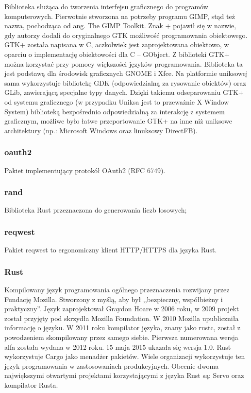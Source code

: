 \documentclass[12pt,a4paper]{article}
\begin{document}
					\indent  Biblioteka służąca do tworzenia interfejsu graficznego do programów komputerowych. Pierwotnie stworzona na potrzeby programu GIMP,
					stąd też nazwa, pochodząca od ang. The GIMP Toolkit. Znak + pojawił się w nazwie, gdy autorzy dodali do oryginalnego GTK możliwość programowania obiektowego.
					GTK+ została napisana w C, aczkolwiek jest zaprojektowana obiektowo, w oparciu o implementację obiektowości dla C – GObject. Z biblioteki GTK+ można korzystać
					przy pomocy większości języków programowania. Biblioteka ta jest podstawą dla środowisk graficznych GNOME i Xfce. Na platformie uniksowej sama wykorzystuje
					bibliotekę GDK (odpowiedzialną za rysowanie obiektów) oraz GLib, zawierającą specjalne typy danych. Dzięki takiemu odseparowaniu GTK+ od systemu graficznego
					(w przypadku Uniksa jest to przeważnie X Window System) biblioteką bezpośrednio odpowiedzialną za interakcję z systemem graficznym, możliwe było łatwe
					przeportowanie GTK+ na inne niż uniksowe architektury (np.: Microsoft Windows oraz linuksowy DirectFB).
				\subsubsection{oauth2}

					\indent Pakiet implementujący protokół OAuth2 (RFC 6749).
				\subsubsection{rand}

					\indent Biblioteka Rust przeznaczona do generowania liczb losowych;
				\subsubsection{reqwest}

					\indent Pakiet reqwest to ergonomiczny klient HTTP/HTTPS dla języka Rust.
				\subsubsection{Rust}

					\indent Kompilowany język programowania ogólnego przeznaczenia rozwijany przez Fundację Mozilla. Stworzony z myślą, aby był ,,bezpieczny, współbieżny i praktyczny''.
					Język zaprojektował Graydon Hoare w 2006 roku, w 2009 projekt został przyjęty pod skrzydła Mozilla Foundation. W 2010 Mozilla upubliczniła informację o języku.
					W 2011 roku kompilator języka, znany jako rustc, został z powodzeniem skompilowany przez samego siebie. Pierwsza numerowana wersja alfa została wydana w 2012 roku.
					15 maja 2015 ukazała się wersja 1.0. Rust wykorzystuje Cargo jako menadżer pakietów. Wiele organizacji wykorzystuje ten język programowania w zastosowaniach
					produkcyjnych. Obecnie dwoma największymi otwartymi projektami korzystającymi z języka Rust są: Servo oraz kompilator Rusta. 
\end{document}
